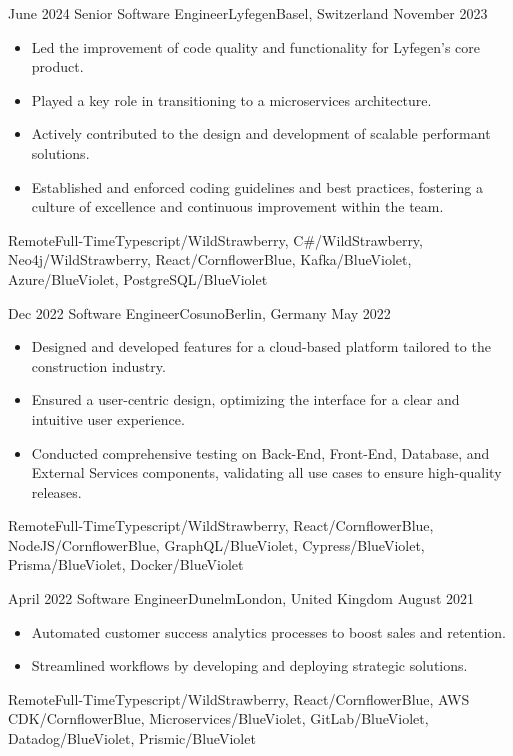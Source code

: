 \begin{experiences}
  \emptySeparator

  \experience
  {June 2024} {Senior Software Engineer}{Lyfegen}{Basel, Switzerland}
  {November 2023}{\begin{itemize}
    \item Led the improvement of code quality and functionality for Lyfegen's core product.
    \item Played a key role in transitioning to a microservices architecture.
    \item Actively contributed to the design and development of scalable performant solutions.
    \item Established and enforced coding guidelines and best practices, fostering a culture of excellence and continuous improvement within the team.
  \end{itemize}}
  {Remote}{Full-Time}{Typescript/WildStrawberry, C\#/WildStrawberry, Neo4j/WildStrawberry, React/CornflowerBlue, Kafka/BlueViolet, Azure/BlueViolet, PostgreSQL/BlueViolet}

  \emptySeparator

  \experience
  {Dec 2022} {Software Engineer}{Cosuno}{Berlin, Germany}
  {May 2022}{\begin{itemize}
    \item Designed and developed features for a cloud-based platform tailored to the construction industry.
    \item Ensured a user-centric design, optimizing the interface for a clear and intuitive user experience.
    \item Conducted comprehensive testing on Back-End, Front-End, Database, and External Services components, validating all use cases to ensure high-quality releases.
  \end{itemize}}
  {Remote}{Full-Time}{Typescript/WildStrawberry, React/CornflowerBlue, NodeJS/CornflowerBlue, GraphQL/BlueViolet, Cypress/BlueViolet, Prisma/BlueViolet, Docker/BlueViolet}

  \emptySeparator

  \experience
  {April 2022} {Software Engineer}{Dunelm}{London, United Kingdom}
  {August 2021}{\begin{itemize}
    \item Automated customer success analytics processes to boost sales and retention.
    \item Streamlined workflows by developing and deploying strategic solutions.
  \end{itemize}}
  {Remote}{Full-Time}{Typescript/WildStrawberry, React/CornflowerBlue, AWS CDK/CornflowerBlue, Microservices/BlueViolet, GitLab/BlueViolet, Datadog/BlueViolet, Prismic/BlueViolet}

\end{experiences}